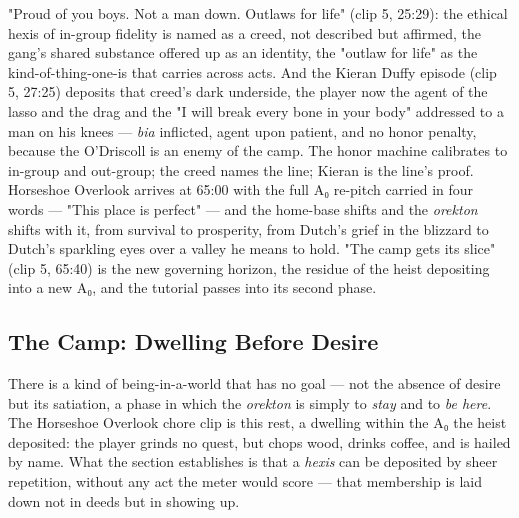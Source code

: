 \documentclass{article}
\begin{document}
"Proud of you boys. Not a man down. Outlaws for life" (clip 5, 25:29): the ethical hexis of in-group fidelity is named as a creed, not described but affirmed, the gang's shared substance offered up as an identity, the "outlaw for life" as the kind-of-thing-one-is that carries across acts. And the Kieran Duffy episode (clip 5, 27:25) deposits that creed's dark underside, the player now the agent of the lasso and the drag and the "I will break every bone in your body" addressed to a man on his knees — \textit{bia} inflicted, agent upon patient, and no honor penalty, because the O'Driscoll is an enemy of the camp. The honor machine calibrates to in-group and out-group; the creed names the line; Kieran is the line's proof. Horseshoe Overlook arrives at 65:00 with the full A₀ re-pitch carried in four words — "This place is perfect" — and the home-base shifts and the \textit{orekton} shifts with it, from survival to prosperity, from Dutch's grief in the blizzard to Dutch's sparkling eyes over a valley he means to hold. "The camp gets its slice" (clip 5, 65:40) is the new governing horizon, the residue of the heist depositing into a new A₀, and the tutorial passes into its second phase.

\bigskip

\subsection*{The Camp: Dwelling Before Desire}

There is a kind of being-in-a-world that has no goal — not the absence of desire but its satiation, a phase in which the \textit{orekton} is simply to \textit{stay} and to \textit{be here}. The Horseshoe Overlook chore clip is this rest, a dwelling within the A₀ the heist deposited: the player grinds no quest, but chops wood, drinks coffee, and is hailed by name. What the section establishes is that a \textit{hexis} can be deposited by sheer repetition, without any act the meter would score — that membership is laid down not in deeds but in showing up.
\end{document}
